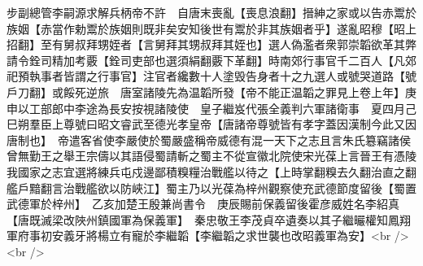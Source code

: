 步副總管李嗣源求解兵柄帝不許　自唐末喪亂【喪息浪翻】搢紳之家或以告赤鬻於族姻【赤當作勅鬻於族姻則既非矣安知後世有鬻於非其族姻者乎】遂亂昭穆【昭上招翻】至有舅叔拜甥姪者【言舅拜其甥叔拜其姪也】選人偽濫者衆郭崇韜欲革其弊請令銓司精加考覈【銓司吏部也選須絹翻覈下革翻】時南郊行事官千二百人【凡郊祀預執事者皆謂之行事官】注官者纔數十人塗毁告身者十之九選人或號哭道路【號戶刀翻】或餒死逆旅　唐室諸陵先為温韜所發【帝不能正温韜之罪見上卷上年】庚申以工部郎中李途為長安按視諸陵使　皇子繼岌代張全義判六軍諸衛事　夏四月己巳朔羣臣上尊號曰昭文睿武至德光孝皇帝【唐諸帝尊號皆有孝字蓋因漢制今此又因唐制也】　帝遣客省使李嚴使於蜀嚴盛稱帝威德有混一天下之志且言朱氏簒竊諸侯曾無勤王之舉王宗儔以其語侵蜀請斬之蜀主不從宣徽北院使宋光葆上言晉王有憑陵我國家之志宜選將練兵屯戍邊鄙積糗糧治戰艦以待之【上時掌翻糗去久翻治直之翻艦戶黯翻言治戰艦欲以防峽江】蜀主乃以光葆為梓州觀察使充武德節度留後【蜀置武德軍於梓州】　乙亥加楚王殷兼尚書令　庚辰賜前保義留後霍彦威姓名李紹真【唐既滅梁改陜州鎮國軍為保義軍】　秦忠敬王李茂貞卒遺奏以其子繼曮權知鳳翔軍府事初安義牙將楊立有寵於李繼韜【李繼韜之求世襲也改昭義軍為安】<br />
<br />
